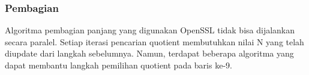 \subsubsection{Pembagian}\label{sec:div_parallel}
Algoritma pembagian panjang yang digunakan OpenSSL tidak bisa dijalankan secara paralel. Setiap iterasi pencarian quotient membutuhkan nilai N yang telah diupdate dari langkah sebelumnya. Namun, terdapat beberapa algoritma yang dapat membantu langkah pemilihan quotient pada baris ke-9.  
